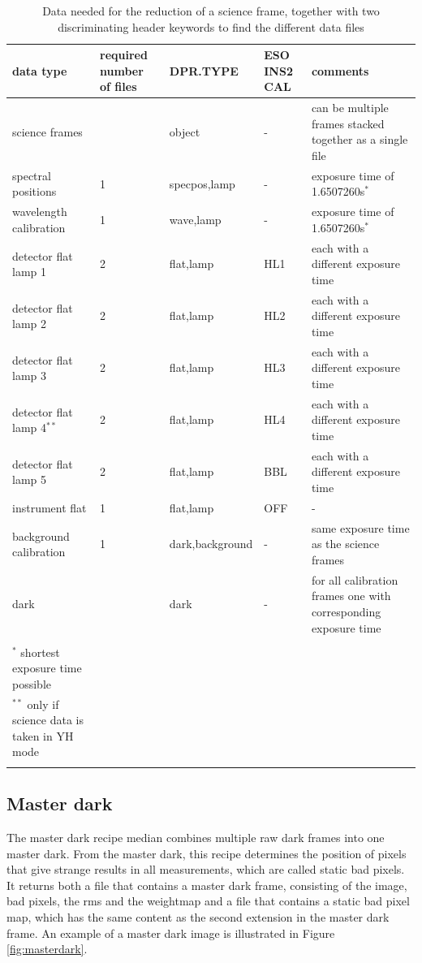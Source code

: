 \documentclass[twoside,single,12pt]{lion-msc}
\begin{document}
\begin{longtable}{| p{} | p{} |p{}|p{}| p{ }|}
\hline
\textbf{data type} & \textbf{required number of files} &\textbf{DPR.TYPE}&\textbf{ESO INS2 CAL} & \textbf{comments}\\\hline
science frames&  & object &-& can be multiple frames stacked together as a single file\\\hline
spectral positions & 1 & specpos,lamp &-& exposure time of 1.6507260s$^*$	\\\hline	
wavelength calibration & 1 & wave,lamp &-& exposure time of 1.6507260s$^*$ \\\hline
detector flat lamp 1 & 2 & flat,lamp & HL1 & each with a different exposure time\\\hline
detector flat lamp 2 & 2 & flat,lamp & HL2 & each with a different exposure time\\\hline
detector flat lamp 3 & 2 & flat,lamp & HL3 & each with a different exposure time\\\hline
detector flat lamp 4$^{**}$ & 2 & flat,lamp & HL4 & each with a different exposure time\\\hline
detector flat lamp 5 & 2 & flat,lamp & BBL & each with a different exposure time\\\hline
instrument flat & 1 & flat,lamp & OFF &- \\\hline
background calibration & 1 & dark,background &-& same exposure time as the science frames\\\hline
dark & & dark &-& for all calibration frames one with corresponding exposure time\\\hline
\caption*{\\$^*$ shortest exposure time possible\\ $^{**}$ only if science data is taken in YH mode}\\%
\caption{Data needed for the reduction of a science frame, together with two discriminating header keywords to find the different data files}%
\label{Tab:data}
\end{longtable}%

\subsection{Master dark}
The master dark recipe median combines multiple raw dark frames into one master dark. From the master dark, this recipe determines the position of pixels that give strange results in all measurements, which are called static bad pixels. It returns both a file that contains a master dark frame, consisting of the image, bad pixels, the rms and the weightmap and a file that contains a static bad pixel map, which has the same content as the second extension in the master dark frame. An example of a master dark image is illustrated in Figure \ref{fig:masterdark}. 
\bigskip
\end{document}

